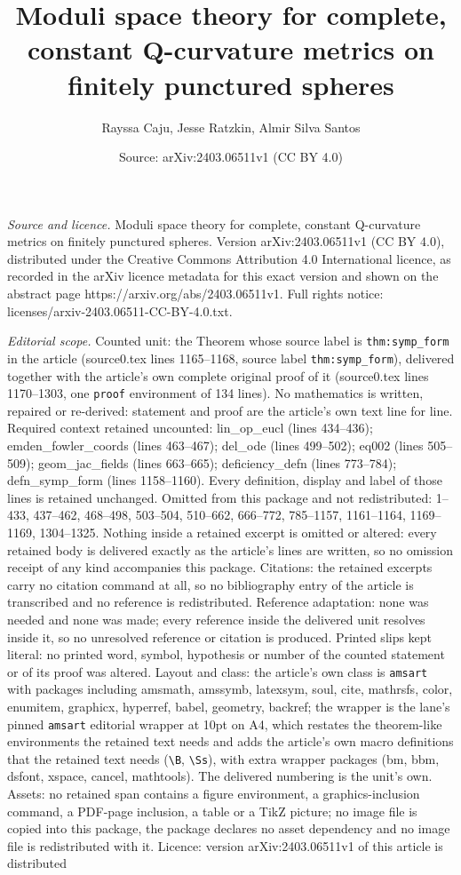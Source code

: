 \documentclass[10pt,a4paper]{amsart}
\title[Moduli space theory for complete, constant Q-curvature metri]{Moduli space theory for complete, constant Q-curvature metrics on finitely punctured spheres}
\author{Rayssa Caju, Jesse Ratzkin, Almir Silva Santos}
\date{Source: arXiv:2403.06511v1 (CC BY 4.0)}
\begin{document}
\maketitle

\noindent\emph{Source and licence.} Moduli space theory for complete, constant Q-curvature metrics on finitely punctured spheres. Version arXiv:2403.06511v1 (CC BY 4.0), distributed under the Creative Commons Attribution 4.0 International licence, as recorded in the arXiv licence metadata for this exact version and shown on the abstract page https://arxiv.org/abs/2403.06511v1. Full rights notice: licenses/arxiv-2403.06511-CC-BY-4.0.txt.\par\smallskip

\noindent\textit{Editorial scope.} Counted unit: the Theorem whose source label is \texttt{thm:symp\_form} in the article (source0.tex lines 1165--1168, source label \texttt{thm:symp\_form}), delivered together with the article's own complete original proof of it (source0.tex lines 1170--1303, one \texttt{proof} environment of 134 lines). No mathematics is written, repaired or re-derived: statement and proof are the article's own text line for line. Required context retained uncounted: lin\_op\_eucl (lines 434--436); emden\_fowler\_coords (lines 463--467); del\_ode (lines 499--502); eq002 (lines 505--509); geom\_jac\_fields (lines 663--665); deficiency\_defn (lines 773--784); defn\_symp\_form (lines 1158--1160). Every definition, display and label of those lines is retained unchanged. Omitted from this package and not redistributed: 1--433, 437--462, 468--498, 503--504, 510--662, 666--772, 785--1157, 1161--1164, 1169--1169, 1304--1325. Nothing inside a retained excerpt is omitted or altered: every retained body is delivered exactly as the article's lines are written, so no omission receipt of any kind accompanies this package. Citations: the retained excerpts carry no citation command at all, so no bibliography entry of the article is transcribed and no reference is redistributed. Reference adaptation: none was needed and none was made; every reference inside the delivered unit resolves inside it, so no unresolved reference or citation is produced. Printed slips kept literal: no printed word, symbol, hypothesis or number of the counted statement or of its proof was altered. Layout and class: the article's own class is \texttt{amsart} with packages including amsmath, amssymb, latexsym, soul, cite, mathrsfs, color, enumitem, graphicx, hyperref, babel, geometry, backref; the wrapper is the lane's pinned \texttt{amsart} editorial wrapper at 10pt on A4, which restates the theorem-like environments the retained text needs and adds the article's own macro definitions that the retained text needs (\texttt{\textbackslash B}, \texttt{\textbackslash Ss}), with extra wrapper packages (bm, bbm, dsfont, xspace, cancel, mathtools). The delivered numbering is the unit's own. Assets: no retained span contains a figure environment, a graphics-inclusion command, a PDF-page inclusion, a table or a TikZ picture; no image file is copied into this package, the package declares no asset dependency and no image file is redistributed with it. Licence: version arXiv:2403.06511v1 of this article is distributed 
\end{document}
